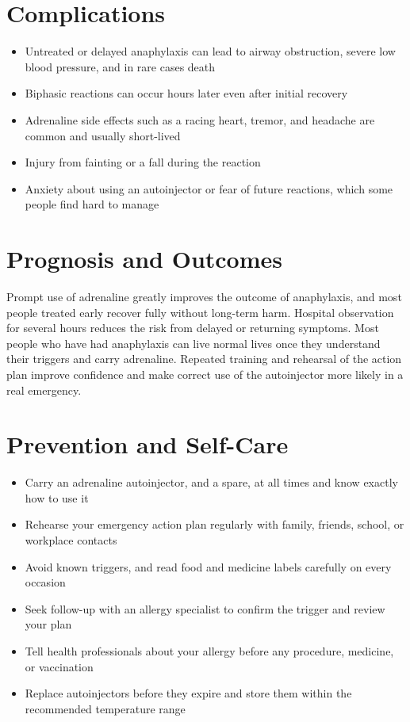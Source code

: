\section*{Complications}
\begin{itemize}
    \item Untreated or delayed anaphylaxis can lead to airway obstruction, severe low blood pressure, and in rare cases death
    \item Biphasic reactions can occur hours later even after initial recovery
    \item Adrenaline side effects such as a racing heart, tremor, and headache are common and usually short-lived
    \item Injury from fainting or a fall during the reaction
    \item Anxiety about using an autoinjector or fear of future reactions, which some people find hard to manage
\end{itemize}

\section*{Prognosis and Outcomes}
Prompt use of adrenaline greatly improves the outcome of anaphylaxis, and most people treated early recover fully without long-term harm. Hospital observation for several hours reduces the risk from delayed or returning symptoms. Most people who have had anaphylaxis can live normal lives once they understand their triggers and carry adrenaline. Repeated training and rehearsal of the action plan improve confidence and make correct use of the autoinjector more likely in a real emergency.

\section*{Prevention and Self-Care}
\begin{itemize}
    \item Carry an adrenaline autoinjector, and a spare, at all times and know exactly how to use it
    \item Rehearse your emergency action plan regularly with family, friends, school, or workplace contacts
    \item Avoid known triggers, and read food and medicine labels carefully on every occasion
    \item Seek follow-up with an allergy specialist to confirm the trigger and review your plan
    \item Tell health professionals about your allergy before any procedure, medicine, or vaccination
    \item Replace autoinjectors before they expire and store them within the recommended temperature range
\end{itemize}

